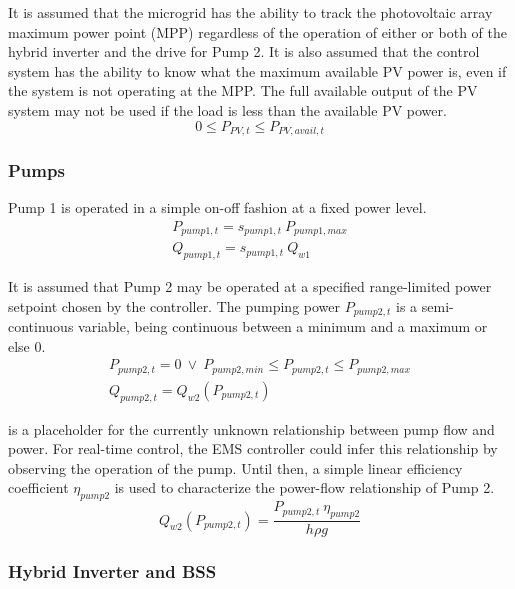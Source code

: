 It is assumed that the microgrid has the ability to track the photovoltaic array maximum power point (MPP) regardless of the operation of either or both of the hybrid inverter and the drive for Pump 2. It is also assumed that the control system has the ability to know what the maximum available PV power is, even if the system is not operating at the MPP. The full available output of the PV system may not be used if the load is less than the available PV power.
%
\begin{equation}
\label{eqn:pv-limit}
0 \le P_{PV,t} \le P_{PV,avail,t}
\end{equation}

\subsubsection{Pumps}

Pump 1 is operated in a simple on-off fashion at a fixed power level.
%
\begin{gather}
\label{eqn:pump1-power}
P_{pump1,t} = s_{pump1,t} \ P_{pump1,max} \\
\label{eqn:pump1-flow}
Q_{pump1,t} = s_{pump1,t} \ Q_{w1}
\end{gather}

It is assumed that Pump 2 may be operated at a specified range-limited power setpoint chosen by the controller. The pumping power $P_{pump2,t}$ is a semi-continuous variable, being continuous between a minimum and a maximum or else 0.
%
\begin{gather}
\label{eqn:pump2-power}
P_{pump2,t} = 0 \ \lor \ P_{pump2,min} \le P_{pump2,t} \le P_{pump2,max} \\
\label{eqn:pump2-flow}
Q_{pump2,t} = Q_{w2}\left( P_{pump2,t} \right)
\end{gather}

 is a placeholder for the currently unknown relationship between pump flow and power. For real-time control, the EMS controller could infer this relationship by observing the operation of the pump. Until then, a simple linear efficiency coefficient $\eta_{pump2}$ is used to characterize the power-flow relationship of Pump 2.
%
\begin{equation}
\label{eqn:pump-flow-relation}
 Q_{w2}\left( P_{pump2,t} \right) = \frac{P_{pump2,t} \ \eta_{pump2}}{h \rho g}
\end{equation}

\subsubsection{Hybrid Inverter and BSS}

